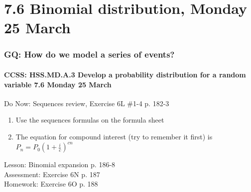 \documentclass{beamer}
\begin{document}
\section{7.6 Binomial distribution, Monday 25 March}
  \frame
  {
    \frametitle{GQ: How do we model a series of events?}
    \framesubtitle{CCSS: HSS.MD.A.3 Develop a probability distribution for a random variable \hfill \alert{7.6 Monday 25 March}}

    \begin{block}{Do Now: Sequences review, Exercise 6L \#1-4 p. 182-3}
    \begin{enumerate}
        \item Use the sequences formulas on the formula sheet
        \item The equation for compound interest (try to remember it first) is $P_n=P_0(1+\frac{i}{c})^{cn}$
    \end{enumerate}
    \end{block}
    Lesson:  Binomial expansion p. 186-8\\
    Assessment: Exercise 6N p. 187\\%
    Homework: Exercise 6O p. 188
  }
\end{document}
